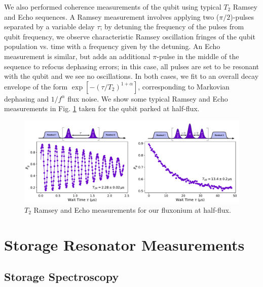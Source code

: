 We also performed coherence measurements of the qubit using typical $T_2$ Ramsey and Echo sequences. A Ramsey measurement involves applying two ($\pi/2$)-pulses separated by a variable delay $\tau$; by detuning the frequency of the pulses from qubit frequency, we observe characteristic Ramsey oscillation fringes of the qubit population vs. time with a frequency given by the detuning. An Echo measurement is similar, but adds an additional $\pi$-pulse in the middle of the sequence to refocus dephasing errors; in this case, all pulses are set to be resonant with the qubit and we see no oscillations. In both cases, we fit to an overall decay envelope of the form $\exp[-(\tau/T_2)^{1 +\alpha}]$, corresponding to Markovian dephasing and $1/f^\alpha$ flux noise. We show some typical Ramsey and Echo measurements in Fig. \ref{fig:4_T2_ramsey_echo} taken for the qubit parked at half-flux.
\begin{figure}[h]
    \centering
    \includegraphics[width=0.95\linewidth]{Figures/4/T2_ramsey_echo.pdf}
    \caption{$T_2$ Ramsey and Echo measurements for our fluxonium at half-flux.}
    \label{fig:4_T2_ramsey_echo}
\end{figure}

\clearpage
\section{Storage Resonator Measurements \label{sec:4_StorageChi}}

\subsection{Storage Spectroscopy}

